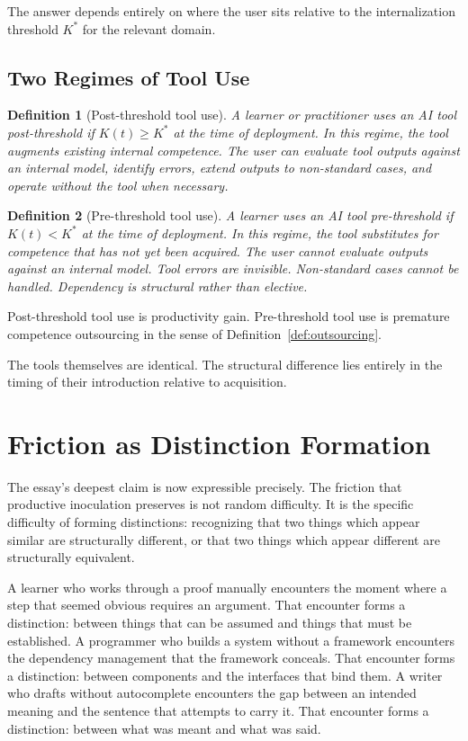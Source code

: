 \documentclass[11pt]{article}
\newtheorem{definition}{Definition}
\theoremstyle{remark}
\begin{document}
The answer depends entirely on where the user sits relative to the internalization threshold $K^*$ for the relevant domain.

\subsection{Two Regimes of Tool Use}

\begin{definition}[Post-threshold tool use]
A learner or practitioner uses an AI tool post-threshold if $K(t) \geq K^*$ at the time of deployment. In this regime, the tool augments existing internal competence. The user can evaluate tool outputs against an internal model, identify errors, extend outputs to non-standard cases, and operate without the tool when necessary.
\end{definition}

\begin{definition}[Pre-threshold tool use]
A learner uses an AI tool pre-threshold if $K(t) < K^*$ at the time of deployment. In this regime, the tool substitutes for competence that has not yet been acquired. The user cannot evaluate outputs against an internal model. Tool errors are invisible. Non-standard cases cannot be handled. Dependency is structural rather than elective.
\end{definition}

Post-threshold tool use is productivity gain. Pre-threshold tool use is premature competence outsourcing in the sense of Definition~\ref{def:outsourcing}.

The tools themselves are identical. The structural difference lies entirely in the timing of their introduction relative to acquisition.

\section{Friction as Distinction Formation}
\label{sec:distinction_formation}

The essay's deepest claim is now expressible precisely. The friction that productive inoculation preserves is not random difficulty. It is the specific difficulty of forming distinctions: recognizing that two things which appear similar are structurally different, or that two things which appear different are structurally equivalent.

A learner who works through a proof manually encounters the moment where a step that seemed obvious requires an argument. That encounter forms a distinction: between things that can be assumed and things that must be established. A programmer who builds a system without a framework encounters the dependency management that the framework conceals. That encounter forms a distinction: between components and the interfaces that bind them. A writer who drafts without autocomplete encounters the gap between an intended meaning and the sentence that attempts to carry it. That encounter forms a distinction: between what was meant and what was said.
\end{document}
